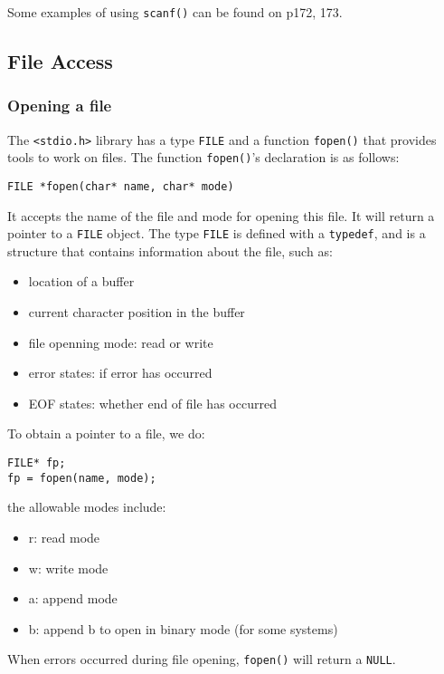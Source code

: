 \documentclass[12pt]{article}
\begin{document}
Some examples of using \texttt{scanf()} can be found on p172, 173.

\subsection{File Access}
\label{sec:org2ddf3fd}
\subsubsection{Opening a file}
\label{sec:org7d8c09e}
The \texttt{<stdio.h>} library has a type \texttt{FILE} and a function \texttt{fopen()} that provides tools to work on files. The function \texttt{fopen()}'s declaration is as follows:
\begin{verbatim}
FILE *fopen(char* name, char* mode)
\end{verbatim}
It accepts the name of the file and mode for opening this file. It will return a pointer to a \texttt{FILE} object. The type \texttt{FILE} is defined with a \texttt{typedef}, and is a structure that contains information about the file, such as:
\begin{itemize}
\item location of a buffer
\item current character position in the buffer
\item file openning mode: read or write
\item error states: if error has occurred
\item EOF states: whether end of file has occurred
\end{itemize}

To obtain a pointer to a file, we do:
\begin{verbatim}
FILE* fp;
fp = fopen(name, mode);
\end{verbatim}
the allowable modes include:
\begin{itemize}
\item r: read mode
\item w: write mode
\item a: append mode
\item b: append b to open in binary mode (for some systems)
\end{itemize}

When errors occurred during file opening, \texttt{fopen()} will return a \texttt{NULL}.
\end{document}
